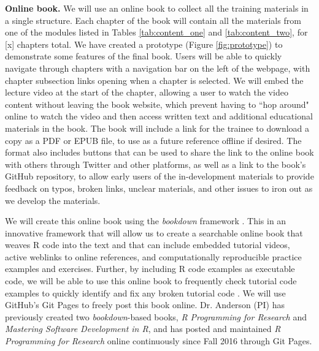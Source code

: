 \documentclass[pdftex,english,11pt,parskip=half]{scrartcl}
\begin{document}
\textbf{Online book.} We will use an online book to collect all the training materials in a single structure. Each chapter of the book will contain all the materials from one of the modules listed in Tables \ref{tab:content_one} and \ref{tab:content_two}, for [x] chapters total. We have created a prototype (Figure \ref{fig:prototype}) to demonstrate some features of the final book. Users will be able to quickly navigate through chapters with a navigation bar on the left of the webpage, with chapter subsection links opening when a chapter is selected. We will embed the lecture video at the start of the chapter, allowing a user to watch the video content without leaving the book website, which prevent having to ``hop around" online to watch the video and then access written text and additional educational materials in the book. The book will include a link for the trainee to download a copy as a PDF or EPUB file, to use as a future reference offline if desired. The format also includes buttons that can be used to share the link to the online book with others through Twitter and other platforms, as well as a link to the book's GitHub repository, to allow early users of the in-development materials to provide feedback on typos, broken links, unclear materials, and other issues to iron out as we develop the materials. 

We will create this online book using the \textit{bookdown} framework \cite{xie2016bookdown}. This in an innovative framework that will allow us to create a searchable online book that weaves R code into the text and that can include embedded tutorial videos, active weblinks to online references, and computationally reproducible practice examples and exercises. Further, by including R code examples as executable code, we will be able to use this online book to frequently check tutorial code examples to quickly identify and fix any broken tutorial code \cite{xie2016bookdown}. We will use GitHub's Git Pages to freely post this book online. Dr. Anderson (PI) has previously created two \textit{bookdown}-based books, \textit{R Programming for Research} and \textit{Mastering Software Development in R}, and has posted and maintained \textit{R Programming for Research} online continuously since Fall 2016 through Git Pages.  
\end{document}
